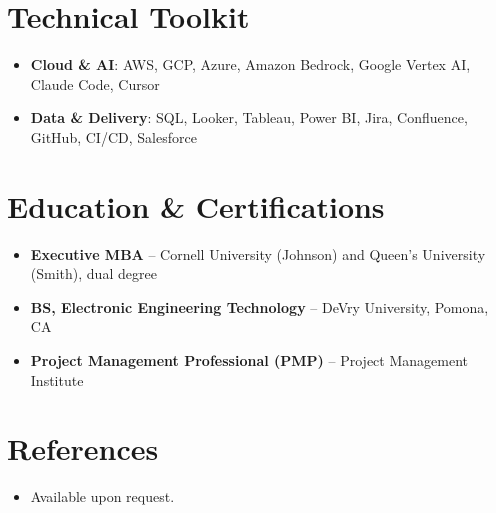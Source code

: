 \documentclass[11pt,letterpaper,sans]{moderncv}
\begin{document}
\section{Technical Toolkit}
\vspace{1pt}
\begin{itemize}
\item{\textbf{Cloud \& AI}: AWS, GCP, Azure, Amazon Bedrock, Google Vertex AI, Claude Code, Cursor}
\item{\textbf{Data \& Delivery}: SQL, Looker, Tableau, Power BI, Jira, Confluence, GitHub, CI/CD, Salesforce}
\end{itemize}


\section{Education \& Certifications}
\vspace{1pt}
\begin{itemize}
\item{\textbf{Executive MBA} -- Cornell University (Johnson) and Queen's University (Smith), dual degree}
\item{\textbf{BS, Electronic Engineering Technology} -- DeVry University, Pomona, CA}
\item{\textbf{Project Management Professional (PMP)} -- Project Management Institute}
\end{itemize}


\section{References}
\vspace{1pt}
\begin{itemize}
\item{Available upon request.}
\end{itemize}
\end{document}
